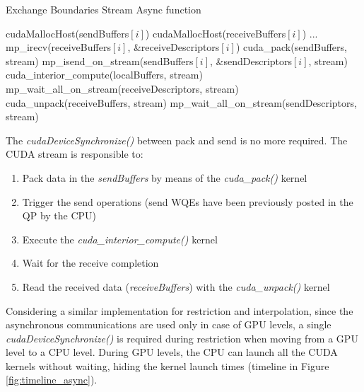 \documentclass[review]{siamart1116}
\begin{document}
\begin{algorithm}
\small
\caption{Exchange Boundaries Stream Async function}
\label{algo:exchange_boundaries_async}
\begin{algorithmic}[1]
\State cudaMallocHost(sendBuffers$[i]$)
\State cudaMallocHost(receiveBuffers$[i]$)
\EndFor
\State ...
 \label{alg:a}
                \State mp\_irecv(receiveBuffers$[i]$, \&receiveDescriptors$[i]$)
        \EndFor
        \State cuda\_pack(sendBuffers, stream)
                \State mp\_isend\_on\_stream(sendBuffers$[i]$, \&sendDescriptors$[i]$, stream)
        \EndFor
        \State cuda\_interior\_compute(localBuffers, stream)
        \State mp\_wait\_all\_on\_stream(receiveDescriptors, stream)
        \State cuda\_unpack(receiveBuffers, stream)
        \State mp\_wait\_all\_on\_stream(sendDescriptors, stream)
\EndFunction
\end{algorithmic}
\end{algorithm}

The \textit{cudaDeviceSynchronize()} between pack and send is no more required. The CUDA stream is responsible to:

\begin{enumerate}
\item Pack data in the \textit{sendBuffers} by means of the \textit{cuda\_pack()} kernel
\item Trigger the send operations (send WQEs have been previously posted in the QP by the CPU)
\item Execute the \textit{cuda\_interior\_compute()} kernel
\item Wait for the receive completion
\item Read the received data (\textit{receiveBuffers}) with the \textit{cuda\_unpack()} kernel
\end{enumerate}

Considering a similar implementation for restriction and interpolation, since the asynchronous communications are used only in case of GPU levels, a single \textit{cudaDeviceSynchronize()} is required during restriction when moving from a GPU level to a CPU level. During GPU levels, the CPU can launch all the CUDA kernels without waiting, hiding the kernel launch times (timeline in Figure \ref{fig:timeline_async}).
\end{document}
